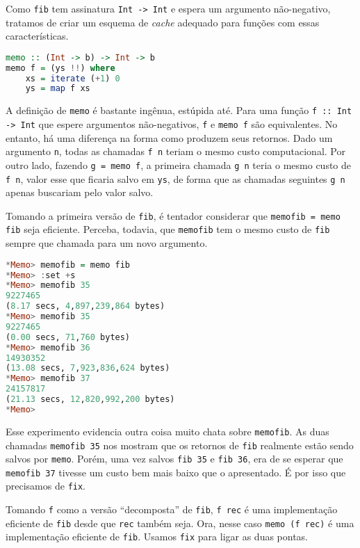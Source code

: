 \documentclass[a4paper]{article}
\begin{document}
Como \texttt{fib} tem assinatura \texttt{Int -> Int} e espera um argumento não-negativo, tratamos de criar um esquema de \emph{cache} adequado para funções com essas características.

\begin{lstlisting}[language=haskell, frame=single]
memo :: (Int -> b) -> Int -> b
memo f = (ys !!) where
	xs = iterate (+1) 0
	ys = map f xs
\end{lstlisting}

A definição de \texttt{memo} é bastante ingênua, estúpida até.
Para uma função \mbox{\texttt{f :: Int -> Int}} que espere argumentos não-negativos, \texttt{f} e \texttt{memo f} são equivalentes.
No entanto, há uma diferença na forma como produzem seus retornos.
Dado um argumento \texttt{n}, todas as chamadas \mbox{\texttt{f n}} teriam o mesmo custo computacional.
Por outro lado, fazendo \texttt{g = memo f}, a primeira chamada \texttt{g n} teria o mesmo custo de \texttt{f n}, valor esse que ficaria salvo em \texttt{ys}, de forma que as chamadas seguintes \texttt{g n} apenas buscariam pelo valor salvo.

Tomando a primeira versão de \texttt{fib}, é tentador considerar que \mbox{\texttt{memofib = memo fib}} seja eficiente.
Perceba, todavia, que \texttt{memofib} tem o mesmo custo de \texttt{fib} sempre que chamada para um novo argumento.

\begin{lstlisting}[language=haskell, frame=single]
*Memo> memofib = memo fib
*Memo> :set +s
*Memo> memofib 35
9227465
(8.17 secs, 4,897,239,864 bytes)
*Memo> memofib 35
9227465
(0.00 secs, 71,760 bytes)
*Memo> memofib 36
14930352
(13.08 secs, 7,923,836,624 bytes)
*Memo> memofib 37
24157817
(21.13 secs, 12,820,992,200 bytes)
*Memo>
\end{lstlisting}

Esse experimento evidencia outra coisa muito chata sobre \texttt{memofib}.
As duas chamadas \texttt{memofib 35} nos mostram que os retornos de \texttt{fib} realmente estão sendo salvos por \texttt{memo}.
Porém, uma vez salvos \texttt{fib 35} e \texttt{fib 36}, era de se esperar que \texttt{memofib 37} tivesse um custo bem mais baixo que o apresentado.
É por isso que precisamos de \texttt{fix}.

Tomando \texttt{f} como a versão ``decomposta'' de \texttt{fib}, \texttt{f rec} é uma implementação eficiente de \texttt{fib} desde que \texttt{rec} também seja.
Ora, nesse caso \texttt{memo (f rec)} é uma implementação eficiente de \texttt{fib}.
Usamos \texttt{fix} para ligar as duas pontas.
\end{document}
